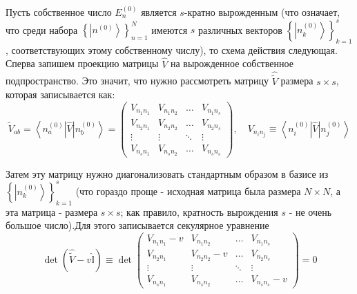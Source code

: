 \documentclass[a4paper,12pt]{article}
\begin{document}
Пусть собственное число $E_{n}^{(0)}$ является $s$-кратно вырожденным
(что означает, что среди набора $\left\{ \left|n^{(0)}\right\rangle \right\} _{n=1}^{N}$
имеются $s$ различных векторов $\left\{ \left|n_{k}^{(0)}\right\rangle \right\} _{k=1}^{s}$,
соответствующих этому собственному числу), то схема действия следующая.
Сперва запишем проекцию матрицы $\hat{V}$ на вырожденное собственное
подпространство. Это значит, что нужно рассмотреть матрицу $\hat{\widetilde{V}}$
размера $s\times s$, которая записывается как:
\[
\widetilde{V}_{ab}=\left\langle n_{a}^{(0)}\left|\hat{V}\right|n_{b}^{(0)}\right\rangle =\begin{pmatrix}V_{n_{1}n_{1}} & V_{n_{1}n_{2}} & \dots & V_{n_{1}n_{s}}\\
V_{n_{2}n_{1}} & V_{n_{2}n_{2}} & \dots & V_{n_{2}n_{s}}\\
\vdots & \vdots & \ddots & \vdots\\
V_{n_{s}n_{1}} & V_{n_{s}n_{2}} & \dots & V_{n_{s}n_{s}}
\end{pmatrix},
\quad V_{n_i n_j} \equiv \left\langle n_i^{(0)} \left|\hat{V}\right|n_j^{(0)}\right\rangle
\]


\noindent
Затем эту матрицу нужно диагонализовать стандартным образом в базисе
из $\left\{ \left|n_{k}^{(0)}\right\rangle \right\} _{k=1}^{s}$ (что
гораздо проще - исходная матрица была размера $N\times N$, а эта
матрица - размера $s\times s$; как правило, кратность вырождения
$s$ - не очень большое число).Для этого записывается секулярное уравнение
\[
\det(\hat{\widetilde{V}}-v\hat{\mathbb{I}})\equiv\det\begin{pmatrix}V_{n_{1}n_{1}}-v & V_{n_{1}n_{2}} & \dots & V_{n_{1}n_{s}}\\
V_{n_{2}n_{1}} & V_{n_{2}n_{2}}-v & \dots & V_{n_{2}n_{s}}\\
\vdots & \vdots & \ddots & \vdots\\
V_{n_{s}n_{1}} & V_{n_{s}n_{2}} & \dots & V_{n_{s}n_{s}}-v
\end{pmatrix}=0
\]
\end{document}

